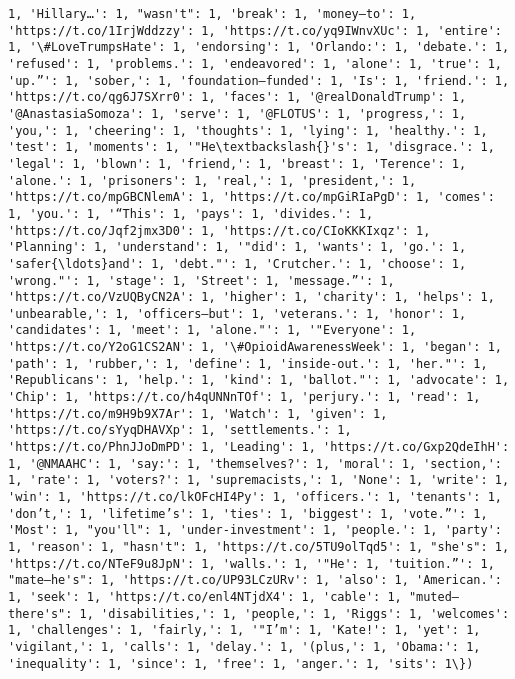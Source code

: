 \documentclass[11pt]{article}
\begin{document}
\begin{Verbatim}[commandchars=\\\{\}]
1, 'Hillary…': 1, "wasn't": 1, 'break': 1, 'money—to': 1, 'https://t.co/1IrjWddzzy': 1, 'https://t.co/yq9IWnvXUc': 1, 'entire': 1, '\#LoveTrumpsHate': 1, 'endorsing': 1, 'Orlando:': 1, 'debate.': 1, 'refused': 1, 'problems.': 1, 'endeavored': 1, 'alone': 1, 'true': 1, 'up.”': 1, 'sober,': 1, 'foundation—funded': 1, 'Is': 1, 'friend.': 1, 'https://t.co/qg6J7SXrr0': 1, 'faces': 1, '@realDonaldTrump': 1, '@AnastasiaSomoza': 1, 'serve': 1, '@FLOTUS': 1, 'progress,': 1, 'you,': 1, 'cheering': 1, 'thoughts': 1, 'lying': 1, 'healthy.': 1, 'test': 1, 'moments': 1, '"He\textbackslash{}'s': 1, 'disgrace.': 1, 'legal': 1, 'blown': 1, 'friend,': 1, 'breast': 1, 'Terence': 1, 'alone.': 1, 'prisoners': 1, 'real,': 1, 'president,': 1, 'https://t.co/mpGBCNlemA': 1, 'https://t.co/mpGiRIaPgD': 1, 'comes': 1, 'you.': 1, '“This': 1, 'pays': 1, 'divides.': 1, 'https://t.co/Jqf2jmx3D0': 1, 'https://t.co/CIoKKKIxqz': 1, 'Planning': 1, 'understand': 1, '"did': 1, 'wants': 1, 'go.': 1, 'safer{\ldots}and': 1, 'debt."': 1, 'Crutcher.': 1, 'choose': 1, 'wrong."': 1, 'stage': 1, 'Street': 1, 'message.”': 1, 'https://t.co/VzUQByCN2A': 1, 'higher': 1, 'charity': 1, 'helps': 1, 'unbearable,': 1, 'officers—but': 1, 'veterans.': 1, 'honor': 1, 'candidates': 1, 'meet': 1, 'alone."': 1, '"Everyone': 1, 'https://t.co/Y2oG1CS2AN': 1, '\#OpioidAwarenessWeek': 1, 'began': 1, 'path': 1, 'rubber,': 1, 'define': 1, 'inside-out.': 1, 'her."': 1, 'Republicans': 1, 'help.': 1, 'kind': 1, 'ballot."': 1, 'advocate': 1, 'Chip': 1, 'https://t.co/h4qUNNnTOf': 1, 'perjury.': 1, 'read': 1, 'https://t.co/m9H9b9X7Ar': 1, 'Watch': 1, 'given': 1, 'https://t.co/sYyqDHAVXp': 1, 'settlements.': 1, 'https://t.co/PhnJJoDmPD': 1, 'Leading': 1, 'https://t.co/Gxp2QdeIhH': 1, '@NMAAHC': 1, 'say:': 1, 'themselves?': 1, 'moral': 1, 'section,': 1, 'rate': 1, 'voters?': 1, 'supremacists,': 1, 'None': 1, 'write': 1, 'win': 1, 'https://t.co/lkOFcHI4Py': 1, 'officers.': 1, 'tenants': 1, 'don’t,': 1, 'lifetime’s': 1, 'ties': 1, 'biggest': 1, 'vote.”': 1, 'Most': 1, "you'll": 1, 'under-investment': 1, 'people.': 1, 'party': 1, 'reason': 1, "hasn't": 1, 'https://t.co/5TU9olTqd5': 1, "she's": 1, 'https://t.co/NTeF9u8JpN': 1, 'walls.': 1, '"He': 1, 'tuition.”': 1, "mate—he's": 1, 'https://t.co/UP93LCzURv': 1, 'also': 1, 'American.': 1, 'seek': 1, 'https://t.co/enl4NTjdX4': 1, 'cable': 1, "muted—there's": 1, 'disabilities,': 1, 'people,': 1, 'Riggs': 1, 'welcomes': 1, 'challenges': 1, 'fairly,': 1, '"I’m': 1, 'Kate!': 1, 'yet': 1, 'vigilant,': 1, 'calls': 1, 'delay.': 1, '(plus,': 1, 'Obama:': 1, 'inequality': 1, 'since': 1, 'free': 1, 'anger.': 1, 'sits': 1\})

    \end{Verbatim}
\end{document}
